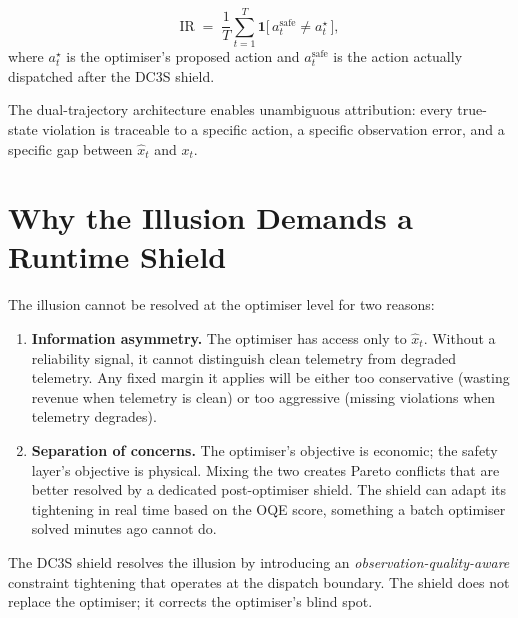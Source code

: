 \begin{definition}
\label{def:ir}
\[
  \mathrm{IR} \;=\; \frac{1}{T} \sum_{t=1}^{T}
  \mathbf{1}\!\bigl[\,a_t^{\mathrm{safe}} \ne a_t^{\star}\,\bigr],
\]
where $a_t^{\star}$ is the optimiser's proposed action and
$a_t^{\mathrm{safe}}$ is the action actually dispatched after the
DC3S shield.
\end{definition}

The dual-trajectory architecture enables unambiguous attribution: every
true-state violation is traceable to a specific action, a specific
observation error, and a specific gap between $\hat{x}_t$ and $x_t$.

\section{Why the Illusion Demands a Runtime Shield}
\label{sec:shield-motivation}

The illusion cannot be resolved at the optimiser level for two reasons:

\begin{enumerate}
  \item \textbf{Information asymmetry.}  The optimiser has access only to
    $\hat{x}_t$.  Without a reliability signal, it cannot distinguish
    clean telemetry from degraded telemetry.  Any fixed margin it
    applies will be either too conservative (wasting revenue when
    telemetry is clean) or too aggressive (missing violations when
    telemetry degrades).
  \item \textbf{Separation of concerns.}  The optimiser's objective is
    economic; the safety layer's objective is physical.  Mixing the two
    creates Pareto conflicts that are better resolved by a dedicated
    post-optimiser shield.  The shield can adapt its tightening in
    real time based on the OQE score, something a batch optimiser
    solved minutes ago cannot do.
\end{enumerate}

The DC3S shield resolves the illusion by introducing an
\emph{observation-quality-aware} constraint tightening that operates at
the dispatch boundary.  The shield does not replace the optimiser; it
corrects the optimiser's blind spot.

